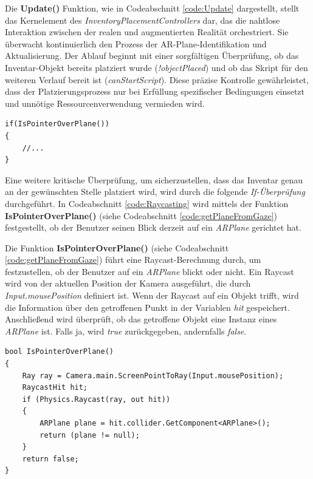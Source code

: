 Die \textbf{Update()} Funktion, wie in Codeabschnitt \ref{code:Update} dargestellt, stellt das Kernelement des
\textit{InventoryPlacementControllers} dar, das die nahtlose Interaktion zwischen der realen und augmentierten Realität
orchestriert. Sie überwacht kontinuierlich den Prozess der AR-Plane-Identifikation und Aktualisierung. Der Ablauf beginnt
mit einer sorgfältigen Überprüfung, ob das Inventar-Objekt bereits platziert wurde (\textit{!objectPlaced}) und ob das
Skript für den weiteren Verlauf bereit ist (\textit{canStartScript}). Diese präzise Kontrolle gewährleistet, dass der
Platzierungsprozess nur bei Erfüllung spezifischer Bedingungen einsetzt und unnötige Ressourcenverwendung vermieden wird.\\

\begin{lstlisting}[style=csharp, caption={Raycasting}, label=code:Raycasting]
if(IsPointerOverPlane())
{
    //...
}
\end{lstlisting}
Eine weitere kritische Überprüfung, um sicherzustellen, dass das Inventar genau an der gewünschten Stelle platziert wird,
wird durch die folgende \textit{If-Überprüfung} durchgeführt. In Codeabschnitt \ref{code:Raycasting} wird mittels der
Funktion \textbf{IsPointerOverPlane()} (siehe Codeabschnitt \ref{code:getPlaneFromGaze}) festgestellt, ob der Benutzer
seinen Blick derzeit auf ein \textit{ARPlane} gerichtet hat.

Die Funktion \textbf{IsPointerOverPlane()} (siehe Codeabschnitt \ref{code:getPlaneFromGaze}) führt eine Raycast-Berechnung
durch, um festzustellen, ob der Benutzer auf ein \textit{ARPlane} blickt oder nicht. Ein Raycast wird von der aktuellen
Position der Kamera ausgeführt, die durch \textit{Input.mousePosition} definiert ist. Wenn der Raycast auf ein Objekt
trifft, wird die Information über den getroffenen Punkt in der Variablen \textit{hit} gespeichert. Anschließend wird
überprüft, ob das getroffene Objekt eine Instanz eines \textit{ARPlane} ist. Falls ja, wird \textit{true} zurückgegeben,
andernfalls \textit{false}.

\begin{lstlisting}[style=csharp, caption={Blick-Ueberpreufungs Funktion}, label=code:getPlaneFromGaze]
bool IsPointerOverPlane()
{
    Ray ray = Camera.main.ScreenPointToRay(Input.mousePosition);
    RaycastHit hit;
    if (Physics.Raycast(ray, out hit))
    {
        ARPlane plane = hit.collider.GetComponent<ARPlane>();
        return (plane != null);
    }
    return false;
}
\end{lstlisting}\\

